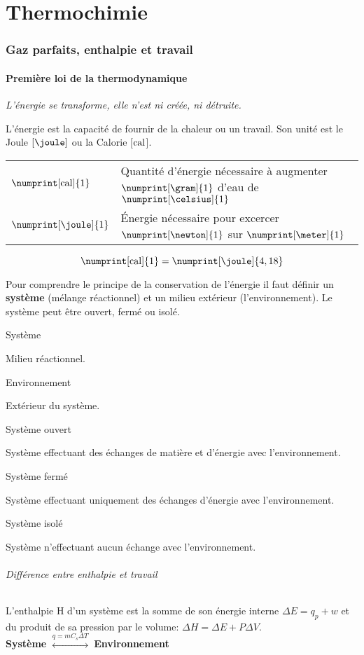 \part{Thermochimie}
\section{Gaz parfaits, enthalpie et travail}
\subsection{Première loi de la thermodynamique}
\emph{L'énergie se transforme, elle n'est ni créée, ni détruite.}

L'énergie est la capacité de fournir de la chaleur ou un travail.
Son unité est le Joule $[\joule]$ ou la Calorie [$\mathrm{cal}$].
\begin{center}
  \begin{tabular}{ll}
    $\numprint[\calo]{1}$ & Quantité  d'énergie nécessaire à augmenter $\numprint[\gram]{1}$ d'eau de $\numprint[\celsius]{1}$\\
    $\numprint[\joule]{1}$ & \'Energie nécessaire pour excercer $\numprint[\newton]{1}$ sur $\numprint[\meter]{1}$
  \end{tabular}
\end{center}
\[ \numprint[\calo]{1} = \numprint[\joule]{4,18} \]

Pour comprendre le principe de la conservation de l'énergie il faut définir un \textbf{système} (mélange réactionnel) et un milieu extérieur (l'environnement).
Le système peut être ouvert, fermé ou isolé.

\subparagraph{Système} Milieu réactionnel.
\subparagraph{Environnement} Extérieur du système.
\subparagraph{Système ouvert} Système effectuant des échanges de matière et d'énergie avec l'environnement.
\subparagraph{Système fermé} Système effectuant uniquement des échanges d'énergie avec l'environnement.
\subparagraph{Système isolé} Système n'effectuant aucun échange avec l'environnement.

\paragraph{Différence entre enthalpie et travail} L'enthalpie H d'un système est la somme de son énergie interne $\Delta E=q_p+w$ et du produit de sa pression par le volume: $\Delta H=\Delta E+P\Delta V$.\\

\textbf{Système} $\stackrel{q=mC_s\Delta T}{\longleftrightarrow}$ \textbf{Environnement}\\

